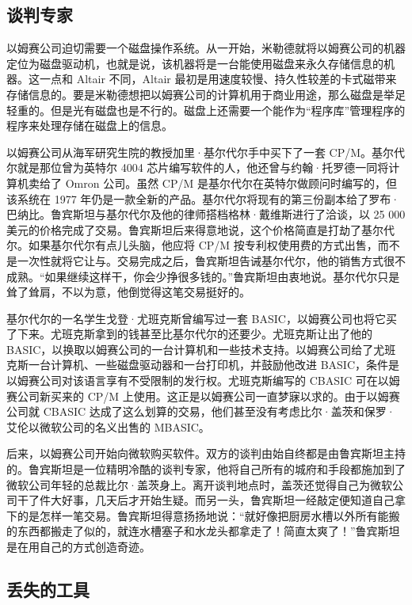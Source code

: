 \documentclass[12pt,UTF8]{ctexbook}
\begin{document}
\subsection{谈判专家}


以姆赛公司迫切需要一个磁盘操作系统。从一开始，米勒德就将以姆赛公司的机器定位为磁盘驱动机，也就是说，该机器将是一台能使用磁盘来永久存储信息的机器。这一点和 Altair 不同，Altair 最初是用速度较慢、持久性较差的卡式磁带来存储信息的。要是米勒德想把以姆赛公司的计算机用于商业用途，那么磁盘是举足轻重的。但是光有磁盘也是不行的。磁盘上还需要一个能作为“程序库”管理程序的程序来处理存储在磁盘上的信息。

以姆赛公司从海军研究生院的教授加里·基尔代尔手中买下了一套 CP/M。基尔代尔就是那位曾为英特尔 4004 芯片编写软件的人，他还曾与约翰·托罗德一同将计算机卖给了 Omron 公司。虽然 CP/M 是基尔代尔在英特尔做顾问时编写的，但该系统在 1977 年仍是一款全新的产品。基尔代尔将现有的第三份副本给了罗布·巴纳比。鲁宾斯坦与基尔代尔及他的律师搭档格林·戴维斯进行了洽谈，以 25 000 美元的价格完成了交易。鲁宾斯坦后来得意地说，这个价格简直是打劫了基尔代尔。如果基尔代尔有点儿头脑，他应将 CP/M 按专利权使用费的方式出售，而不是一次性就将它让与。交易完成之后，鲁宾斯坦告诫基尔代尔，他的销售方式很不成熟。“如果继续这样干，你会少挣很多钱的。”鲁宾斯坦由衷地说。基尔代尔只是耸了耸肩，不以为意，他倒觉得这笔交易挺好的。

基尔代尔的一名学生戈登·尤班克斯曾编写过一套 BASIC，以姆赛公司也将它买了下来。尤班克斯拿到的钱甚至比基尔代尔的还要少。尤班克斯让出了他的 BASIC，以换取以姆赛公司的一台计算机和一些技术支持。以姆赛公司给了尤班克斯一台计算机、一些磁盘驱动器和一台打印机，并鼓励他改进 BASIC，条件是以姆赛公司对该语言享有不受限制的发行权。尤班克斯编写的 CBASIC 可在以姆赛公司新买来的 CP/M 上使用。这正是以姆赛公司一直梦寐以求的。由于以姆赛公司就 CBASIC 达成了这么划算的交易，他们甚至没有考虑比尔·盖茨和保罗·艾伦以微软公司的名义出售的 MBASIC。

后来，以姆赛公司开始向微软购买软件。双方的谈判由始自终都是由鲁宾斯坦主持的。鲁宾斯坦是一位精明冷酷的谈判专家，他将自己所有的城府和手段都施加到了微软公司年轻的总裁比尔·盖茨身上。离开谈判地点时，盖茨还觉得自己为微软公司干了件大好事，几天后才开始生疑。而另一头，鲁宾斯坦一经敲定便知道自己拿下的是怎样一笔交易。鲁宾斯坦得意扬扬地说：“就好像把厨房水槽以外所有能搬的东西都搬走了似的，就连水槽塞子和水龙头都拿走了！简直太爽了！”鲁宾斯坦是在用自己的方式创造奇迹。





\subsection{丢失的工具}
\end{document}
